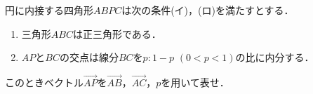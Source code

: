 \documentclass[../../main.tex]{subfiles}
\begin{document}
円に内接する四角形$ABPC$は次の条件(イ)，(ロ)を満たすとする．
\begin{enumerate}
  \item[(イ)] 三角形$ABC$は正三角形である．
  \item[(ロ)] $AP$と$BC$の交点は線分$BC$を$p:1-p$ $(0<p<1)$の比に内分する．
\end{enumerate}
このときベクトル$\overrightarrow{AP}$を$\overrightarrow{AB}$，$\overrightarrow{AC}$，$p$を用いて表せ．
\end{document}
